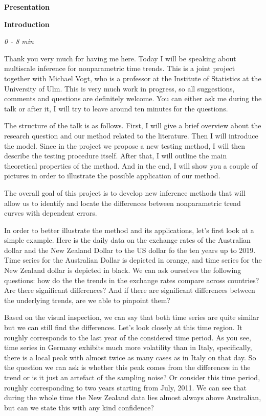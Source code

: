\documentclass[a4paper,12pt]{article}
\begin{document}
\begin{center}
\Large{\textbf{Presentation}}
\end{center}
\textbf{Introduction}

\emph{0 - 8 min}

Thank you very much for having me here. Today I will be speaking about multiscale inference for nonparametric time trends. This is a joint project together with Michael Vogt, who is a professor at the Institute of Statistics at the University of Ulm. This is very much work in progress, so all suggestions, comments and questions are definitely welcome. You can either ask me during the talk or after it, I will try to leave around ten minutes for the questions.

The structure of the talk is as follows. First, I will give a brief overview about the research question and our method related to the literature. Then I will introduce the model. Since in the project we propose a new testing method, I will then describe the testing procedure itself. After that, I will outline the main theoretical properties of the method. And in the end, I will show you a couple of pictures in order to illustrate the possible application of our method.

The overall goal of this project is to develop new inference methods that will allow us to identify and locate the differences between nonparametric trend curves with dependent errors. 

In order to better illustrate the method and its applications, let's first look at a simple example. Here is the daily data on the exchange rates of the Australian dollar and the New Zealand Dollar to the US dollar fo the ten years up to 2019. Time series for the Australian Dollar is depicted in orange, and time series for the New Zealand dollar is depicted in black. We can ask ourselves the following questions: how do the the trends in the exchange rates compare across countries? Are there significant differences? And if there are significant differences between the underlying trends, are we able to pinpoint them?

Based on the visual inspection, we can say that both time series are quite similar but we can still find the differences. Let's look closely at this time region. It roughly corresponds to the last year of the considered time period. As you see, time series in Germany exhibits much more volatility than in Italy, specifically, there is a local peak with almost twice as many cases as in Italy on that day. So the question we can ask is whether this peak comes from the differences in the trend or is it just an artefact of the sampling noise? Or consider this time period, roughly corresponding to two years starting from July, 2011. We can see that during the whole time the New Zealand data lies almost always above Australian, but can we state this with any kind confidence?
\end{document}
